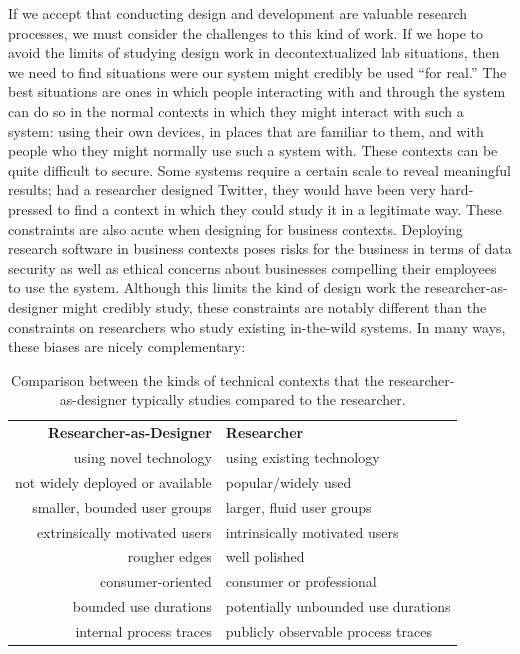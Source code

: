 If we accept that conducting design and development are valuable research processes, we must consider the challenges to this kind of work. If we hope to avoid the limits of studying design work in decontextualized lab situations, then we need to find situations were our system might credibly be used ``for real.'' The best situations are ones in which people interacting with and through the system can do so in the normal contexts in which they might interact with such a system: using their own devices, in places that are familiar to them, and with people who they might normally use such a system with. These contexts can be quite difficult to secure. Some systems require a certain scale to reveal meaningful results; had a researcher designed Twitter, they would have been very hard-pressed to find a context in which they could study it in a legitimate way. These constraints are also acute when designing for business contexts. Deploying research software in business contexts poses risks for the business in terms of data security as well as ethical concerns about businesses compelling their employees to use the system. Although this limits the kind of design work the researcher-as-designer might credibly study, these constraints are notably different than the constraints on researchers who study existing in-the-wild systems. In many ways, these biases are nicely complementary:

\begin{table}[tb]
\begin{tabular}{r|l}
\textbf{Researcher-as-Designer} & \textbf{Researcher} \\
using novel technology & using existing technology \\
not widely deployed or available & popular/widely used \\
smaller, bounded user groups & larger, fluid user groups \\
extrinsically motivated users & intrinsically motivated users\\
rougher edges & well polished\\
consumer-oriented & consumer or professional\\
bounded use durations & potentially unbounded use durations\\
internal process traces & publicly observable process traces\\
\end{tabular}
\label{table:research-focus-comparison}
\caption{Comparison between the kinds of technical contexts that the researcher-as-designer typically studies compared to the researcher.}
\end{table}

